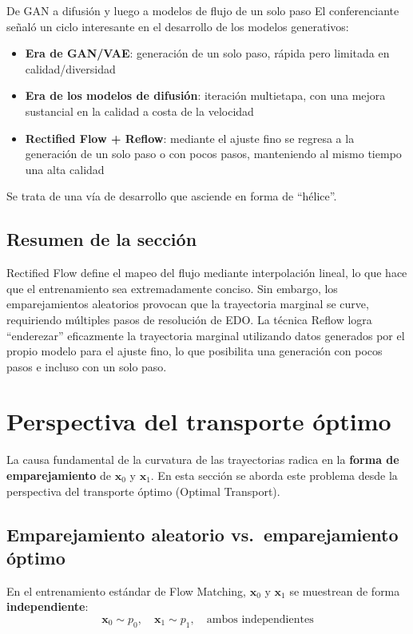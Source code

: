 \documentclass[a4paper]{article}
\begin{document}
\begin{knowledgebox}{De GAN a difusión y luego a modelos de flujo de un solo paso}
El conferenciante señaló un ciclo interesante en el desarrollo de los modelos generativos:
\begin{itemize}
    \item \textbf{Era de GAN/VAE}: generación de un solo paso, rápida pero limitada en calidad/diversidad
    \item \textbf{Era de los modelos de difusión}: iteración multietapa, con una mejora sustancial en la calidad a costa de la velocidad
    \item \textbf{Rectified Flow + Reflow}: mediante el ajuste fino se regresa a la generación de un solo paso o con pocos pasos, manteniendo al mismo tiempo una alta calidad
\end{itemize}
Se trata de una vía de desarrollo que asciende en forma de ``hélice''.
\end{knowledgebox}

\subsection{Resumen de la sección}

Rectified Flow define el mapeo del flujo mediante interpolación lineal, lo que hace que el entrenamiento sea extremadamente conciso. Sin embargo, los emparejamientos aleatorios provocan que la trayectoria marginal se curve, requiriendo múltiples pasos de resolución de EDO. La técnica Reflow logra ``enderezar'' eficazmente la trayectoria marginal utilizando datos generados por el propio modelo para el ajuste fino, lo que posibilita una generación con pocos pasos e incluso con un solo paso.
\section{Perspectiva del transporte óptimo}

La causa fundamental de la curvatura de las trayectorias radica en la \textbf{forma de emparejamiento} de $\mathbf{x}_0$ y $\mathbf{x}_1$. En esta sección se aborda este problema desde la perspectiva del transporte óptimo (Optimal Transport).

\subsection{Emparejamiento aleatorio vs.\ emparejamiento óptimo}

En el entrenamiento estándar de Flow Matching, $\mathbf{x}_0$ y $\mathbf{x}_1$ se muestrean de forma \textbf{independiente}:
$$\mathbf{x}_0 \sim p_0, \quad \mathbf{x}_1 \sim p_1, \quad \text{ambos independientes}$$
\end{document}
